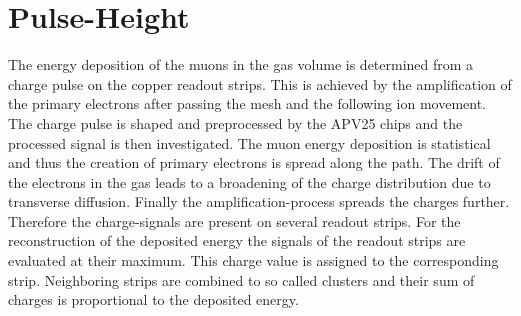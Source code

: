 \documentclass[
twoside,            %
BCOR1.4cm,          %
10pt,               %
headings=normal,    %
headsepline,        %
clearplainpage,		%
final,              %
div=14,
open=right,
bibliography=toc
]{scrreprt}
\begin{document}

\section{Pulse-Height}\label{pulseHeight}

The energy deposition of the muons in the gas volume is determined from a charge pulse on the copper readout strips. 
This is achieved by the amplification of the primary electrons after passing the mesh and the following ion movement.
The charge pulse is shaped and preprocessed by the APV25 chips and the processed signal is then investigated.
The muon energy deposition is statistical and thus the creation of primary electrons is spread along the path.
The drift of the electrons in the gas leads to a broadening of the charge distribution due to transverse diffusion.
Finally the amplification-process spreads the charges further.
Therefore the charge-signals are present on several readout strips.
For the reconstruction of the deposited energy the signals of the readout strips are evaluated at their maximum.
This charge value is assigned to the corresponding strip.
Neighboring strips are combined to so called clusters and their sum of charges is proportional to the deposited energy.
\end{document}
